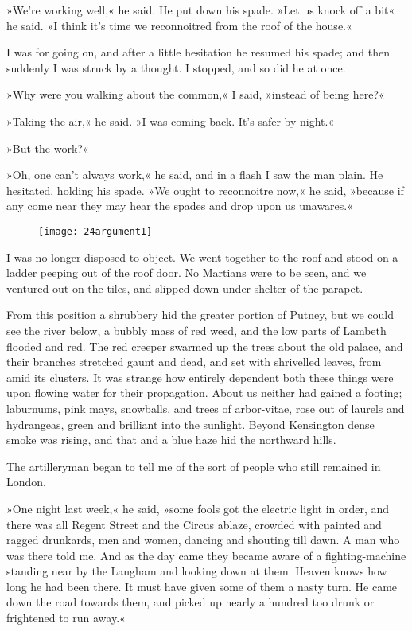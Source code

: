»We're working well,« he said. He put down his spade. »Let us knock off a bit« he said. »I think it's time we reconnoitred from the roof of the house.«

I was for going on, and after a little hesitation he resumed his spade; and then suddenly I was struck by a thought. I stopped, and so did he at once.

»Why were you walking about the common,« I said, »instead of being here?«

»Taking the air,« he said. »I was coming back. It's safer by night.«

»But the work?«

»Oh, one can't always work,« he said, and in a flash I saw the man plain. He hesitated, holding his spade. »We ought to reconnoitre now,« he said, »because if any come near they may hear the spades and drop upon us unawares.«

\begin{figure}[tb]
\centering
\texttt{[image: 24argument1]}
\end{figure}

I was no longer disposed to object. We went together to the roof and stood on a ladder peeping out of the roof door. No Martians were to be seen, and we ventured out on the tiles, and slipped down under shelter of the parapet.

From this position a shrubbery hid the greater portion of Putney, but we could see the river below, a bubbly mass of red weed, and the low parts of Lambeth flooded and red. The red creeper swarmed up the trees about the old palace, and their branches stretched gaunt and dead, and set with shrivelled leaves, from amid its clusters. It was strange how entirely dependent both these things were upon flowing water for their propagation. About us neither had gained a footing; laburnums, pink mays, snowballs, and trees of arbor-vitae, rose out of laurels and hydrangeas, green and brilliant into the sunlight. Beyond Kensington dense smoke was rising, and that and a blue haze hid the northward hills.

The artilleryman began to tell me of the sort of people who still remained in London.

»One night last week,« he said, »some fools got the electric light in order, and there was all Regent Street and the Circus ablaze, crowded with painted and ragged drunkards, men and women, dancing and shouting till dawn. A man who was there told me. And as the day came they became aware of a fighting-machine standing near by the Langham and looking down at them. Heaven knows how long he had been there. It must have given some of them a nasty turn. He came down the road towards them, and picked up nearly a hundred too drunk or frightened to run away.«


